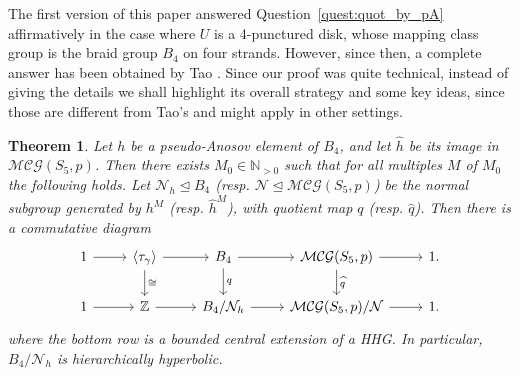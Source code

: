 \documentclass[svgnames]{amsart}
\theoremstyle{plain}
\newtheorem{thm}{Theorem}[section]
\theoremstyle{definition}
\newcommand{\cal}[1]{\mathcal{#1}}
\newcommand{\calG}{\cal{MCG}}
\newcommand{\N}{\cal{N}}
\newcommand{\h}[1]{\widehat{#1}}
\begin{document}
The first version of this paper answered Question~\ref{quest:quot_by_pA} affirmatively in the case where $U$ is a 4-punctured disk, whose mapping class group is the braid group $B_4$ on four strands. However, since then, a complete answer has been obtained by Tao \cite[Corollary 1.7]{tao2025extensiontheoremquasimorphisms}. Since our proof was quite technical, instead of giving the details we shall highlight its overall strategy and some key ideas, since those are different from Tao's and might apply in other settings.






\begin{thm}
\label{thm:braids}
Let $h$ be a pseudo-Anosov element of $B_4$, and let $\hat h$ be its image in $\calG(S_5, p)$. Then there exists $M_0\in\mathbb{N}_{>0}$ such that for all multiples $M$ of $M_0$ the following holds. Let $\N_h\unlhd B_4$ (resp. $\N\unlhd \calG(S_5, p)$) be the normal subgroup generated by $h^M$ (resp. $\hat{h}^M$), with quotient map $q$ (resp. $\h q$). Then there is a commutative diagram
$$\begin{tikzcd}
    1\ar{r}& \langle \tau_\gamma\rangle \ar{r}\ar[d,"\cong"]&B_4\ar{r}\ar[d,"q"]&\calG(S_5, p)\ar{r}\ar[d,"\h q"]&1.\\
    1\ar{r}& \mathbb Z\ar{r}&B_4/\N_h\ar{r}&\calG(S_5, p)/\N\ar{r}&1.
\end{tikzcd}$$
    where the bottom row is a bounded central extension of a HHG. In particular, $B_4/\N_h$ is hierarchically hyperbolic.
\end{thm}
\end{document}
